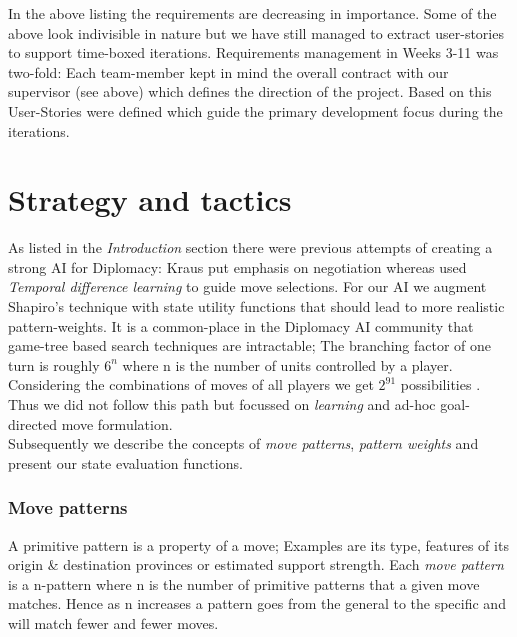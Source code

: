 \documentclass[pdftex,12pt,a4paper]{report}
\begin{document}
In the above listing the requirements are decreasing in
importance. Some of the above look indivisible in nature but we have
still managed to extract user-stories to support time-boxed
iterations. Requirements management in Weeks 3-11 was two-fold: Each
team-member kept in mind the overall contract with our supervisor (see
above) which defines the direction of the project.  Based on this
User-Stories were defined which guide the primary development focus
during the iterations.


\section{Strategy and tactics}

As listed in the \textit{Introduction} section there were previous
attempts of creating a strong AI for Diplomacy: Kraus \cite{Kraus95}
put emphasis on negotiation whereas \cite{Shapiro02} used
\textit{Temporal difference learning} to guide move selections. For
our AI we augment Shapiro's technique with state utility functions
that should lead to more realistic pattern-weights. It is a
common-place in the Diplomacy AI community that game-tree based search
techniques are intractable; The branching factor of one turn
is roughly $6^{n}$ where n is the number of units controlled by a
player. Considering the combinations of moves of all players we get
$2^{91}$ possibilities \cite{Shapiro02}. Thus we did not follow this
path but focussed on \textit{learning} and ad-hoc goal-directed move
formulation. \\

Subsequently we describe the concepts of \textit{move patterns},
\textit{pattern weights} and present our state evaluation functions.

\subsubsection{Move patterns}

A primitive pattern is a property of a move; Examples are its type,
features of its origin \& destination provinces or estimated support
strength. Each \textit{move pattern} is a n-pattern where n is the
number of primitive patterns that a given move matches. Hence as n
increases a pattern goes from the general to the specific and will
match fewer and fewer moves. \\
\end{document}
